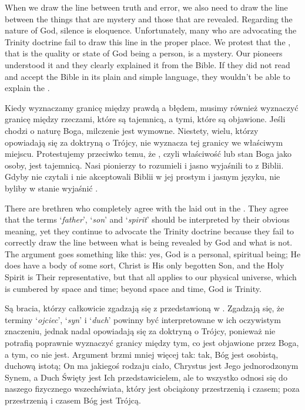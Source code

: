 When we draw the line between truth and error, we also need to draw the line between the things that are mystery and those that are revealed. Regarding the nature of God, silence is eloquence. Unfortunately, many who are advocating the Trinity doctrine fail to draw this line in the proper place. We protest that the , that is the quality or state of God being a person, is a mystery. Our pioneers understood it and they clearly explained it from the Bible. If they did not read and accept the Bible in its plain and simple language, they wouldn’t be able to explain the .


Kiedy wyznaczamy granicę między prawdą a błędem, musimy również wyznaczyć granicę między rzeczami, które są tajemnicą, a tymi, które są objawione. Jeśli chodzi o naturę Boga, milczenie jest wymowne. Niestety, wielu, którzy opowiadają się za doktryną o Trójcy, nie wyznacza tej granicy we właściwym miejscu. Protestujemy przeciwko temu, że , czyli właściwość lub stan Boga jako osoby, jest tajemnicą. Nasi pionierzy to rozumieli i jasno wyjaśnili to z Biblii. Gdyby nie czytali i nie akceptowali Biblii w jej prostym i jasnym języku, nie byliby w stanie wyjaśnić .


There are brethren who completely agree with the  laid out in the . They agree that the terms ‘\textit{father}’, ‘\textit{son}’ and ‘\textit{spirit}’ should be interpreted by their obvious meaning, yet they continue to advocate the Trinity doctrine because they fail to correctly draw the line between what is being revealed by God and what is not. The argument goes something like this: yes, God is a personal, spiritual being; He does have a body of some sort, Christ is His only begotten Son, and the Holy Spirit is Their representative, but that all applies to our physical universe, which is cumbered by space and time; beyond space and time, God is Trinity.


Są bracia, którzy całkowicie zgadzają się z  przedstawioną w . Zgadzają się, że terminy ‘\textit{ojciec}’, ‘\textit{syn}’ i ‘\textit{duch}’ powinny być interpretowane w ich oczywistym znaczeniu, jednak nadal opowiadają się za doktryną o Trójcy, ponieważ nie potrafią poprawnie wyznaczyć granicy między tym, co jest objawione przez Boga, a tym, co nie jest. Argument brzmi mniej więcej tak: tak, Bóg jest osobistą, duchową istotą; On ma jakiegoś rodzaju ciało, Chrystus jest Jego jednorodzonym Synem, a Duch Święty jest Ich przedstawicielem, ale to wszystko odnosi się do naszego fizycznego wszechświata, który jest obciążony przestrzenią i czasem; poza przestrzenią i czasem Bóg jest Trójcą.


